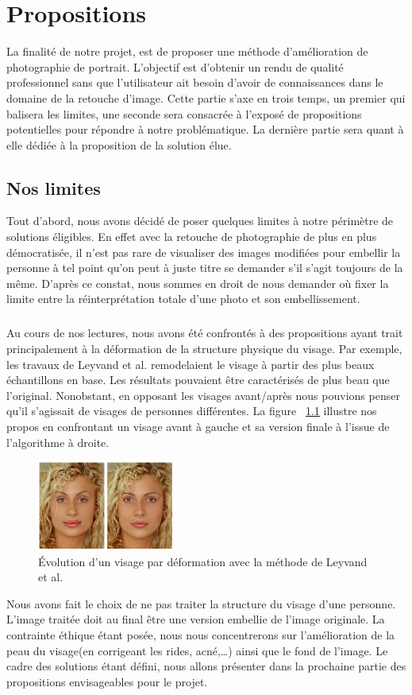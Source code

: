 \documentclass[11pt, french]{report-rd-info}
\begin{document}
\chapter{Propositions}
\label{chap:Propositions}
La finalité de notre projet, est de proposer une méthode d'amélioration de photographie de portrait. L’objectif est d’obtenir un rendu de qualité professionnel sans que l’utilisateur ait besoin d’avoir de connaissances dans le domaine de la retouche d’image.
Cette partie s’axe en trois temps, un premier qui balisera les limites, une seconde sera consacrée à l’exposé de propositions potentielles pour répondre à notre problématique. La dernière partie sera quant à elle dédiée à la proposition de la solution élue.
\section{Nos limites}
Tout d’abord, nous avons décidé de poser quelques limites à notre périmètre de solutions éligibles. En effet avec la retouche de photographie de plus en plus démocratisée, il n’est pas rare de visualiser des images modifiées pour embellir la personne à tel point qu’on peut à juste titre se demander s’il s’agit toujours de la même. D’après ce constat, nous sommes en droit de nous demander où fixer la limite entre la réinterprétation totale d’une photo et son embellissement.
\paragraph*{}
Au cours de nos lectures, nous avons été confrontés à des propositions ayant trait principalement à la déformation de la structure physique du visage. Par exemple, les travaux de Leyvand et al.\cite{Leyvand2008} remodelaient le visage à partir des plus beaux échantillons en base. Les résultats pouvaient être caractérisés de plus beau que l’original. Nonobstant, en opposant les visages avant/après nous pouvions penser qu’il s'agissait de visages de personnes différentes. La figure ~\ref{fig:VisagesData} illustre nos propos en confrontant un visage avant à gauche et sa version finale à l’issue de l’algorithme à droite.
\begin{figure}
	\centering
	\includegraphics[width=0.4\textwidth]{Images/ea_data_visages}
	\caption{Évolution d’un visage par déformation avec la méthode de Leyvand et al.\cite{Leyvand2008}}
	\label{fig:VisagesData}
\end{figure}
Nous avons fait le choix de ne pas traiter la structure du visage d’une personne. L’image traitée doit au final être une version embellie de l’image originale. La contrainte éthique étant posée,  nous nous concentrerons sur l’amélioration de la peau du visage(en corrigeant les rides, acné,\ldots) ainsi que le fond de l’image.
Le cadre des solutions étant défini, nous allons présenter dans la prochaine partie des propositions envisageables pour le projet.
\end{document}
